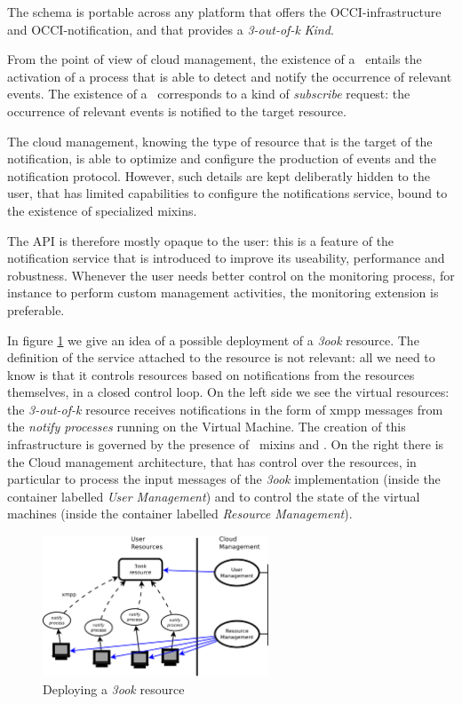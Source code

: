 \documentclass[10pt,a4paper]{article}
\begin{document}
The schema is portable across any platform that offers the OCCI-infrastructure and OCCI-notification, and that provides a  {\em 3-out-of-k} {\em Kind}.

From the point of view of cloud management, the existence of a \smx\ entails the activation of a process that is able to detect and notify the occurrence of relevant events. The existence of a \ntfl\ corresponds to a kind of {\em subscribe} request: the occurrence of relevant events is notified to the target resource. 

The cloud management, knowing the type of resource that is the target of the notification, is able to optimize and configure the production of events and the notification protocol. However, such details are kept deliberatly hidden to the user, that has limited capabilities to configure the notifications service, bound to the existence of specialized mixins.

The API is therefore mostly opaque to the user: this is a feature of the notification service that is introduced to improve its useability, performance and robustness. Whenever the user needs better control on the monitoring process, for instance to perform custom management activities, the monitoring extension is preferable.

In figure \ref{fig:deploy} we give an idea of a possible deployment of a {\em 3ook} resource. The definition of the service attached to the resource is not relevant: all we need to know is that it controls resources based on notifications from the resources themselves, in a closed control loop. On the left side we see the virtual resources: the {\em 3-out-of-k} resource receives notifications in the form of {\sc xmpp} messages from the {\em notify processes} running on the Virtual Machine. The creation of this infrastructure is governed by the presence of \smx\ mixins and \ntfl. On the right there is the Cloud management architecture, that has control over the resources, in particular to process the input messages of the {\em 3ook} implementation (inside the container labelled {\em User Management}) and to control the state of the virtual machines (inside the container labelled {\em Resource Management}).

\begin{figure}
\centering
\includegraphics[width=0.6\textwidth]{figs/notificationDeploy.pdf}
\caption{Deploying a {\em 3ook} resource \label{fig:deploy}}
\end{figure}
\end{document}
